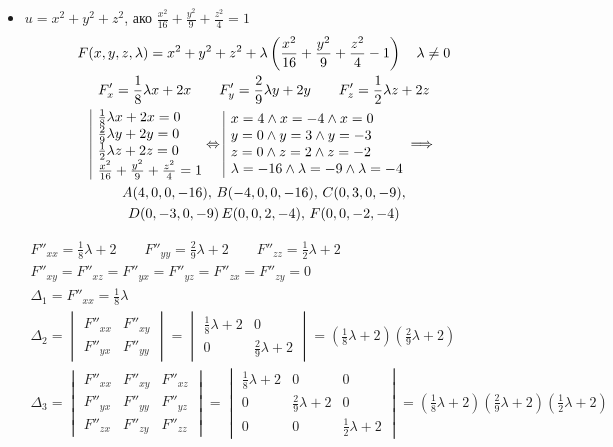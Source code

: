 \documentclass[a4paper,fleqn,12pt]{article}
\theoremstyle{definition}
\begin{document}
\begin{itemize}
\item $u = x^2 + y^2 + z^2$, ако $\frac{x^2}{16} + \frac{y^2}{9} + \frac{z^2}{4} = 1$
\begin{gather*}
F(x,y,z,\lambda) = x^2 + y^2 + z^2 + \lambda\left( \frac{x^2}{16} + \frac{y^2}{9} + \frac{z^2}{4} - 1 \right)   \quad \lambda \neq 0 \\
F'_x = \frac{1}{8}\lambda x + 2x \qquad F'_y = \frac{2}{9}\lambda y+ 2y \qquad F'_z = \frac{1}{2}\lambda z + 2z\\
\begin{array}{|l@{}}
\frac{1}{8}\lambda x + 2x= 0\\
\frac{2}{9}\lambda y+ 2y = 0 \\
\frac{1}{2}\lambda z + 2z = 0\\
\frac{x^2}{16} + \frac{y^2}{9} + \frac{z^2}{4} = 1
\end{array}\Leftrightarrow 
\begin{array}{|l@{}}
x =  4 \land x = -4 \land x = 0\\
y =  0 \land y = 3 \land y = -3\\
z = 0 \land z = 2 \land z = -2 \\
\lambda = -16 \land \lambda = -9 \land \lambda = -4
\end{array} \implies \\ 
A (4,0,0,-16), \, 
B(-4,0,0,-16), \, 
C(0,3,0,-9), \\
D(0,-3,0,-9) \, 
E(0,0,2,-4), \, 
F(0,0,-2,-4) 
\end{gather*}

\begin{gather*}
F''_{xx} = \frac{1}{8} \lambda + 2 \qquad  F''_{yy} = \frac{2}{9} \lambda + 2 \qquad  F''_{zz} = \frac{1}{2} \lambda + 2 \\
F''_{xy} = F''_{xz} = F''_{yx} = F''_{yz} = F''_{zx} = F''_{zy} = 0 \\ 
\Delta_1 = F''_{xx} =  \frac{1}{8} \lambda \\
\Delta_2 = \begin{vmatrix} F''_{xx} & F''_{xy} \\ F''_{yx} & F''_{yy} \end{vmatrix} = \begin{vmatrix} \frac{1}{8} \lambda + 2 & 0 \\  0 & \frac{2}{9} \lambda + 2  \end{vmatrix} = \left( \frac{1}{8} \lambda + 2 \right)\left( \frac{2}{9} \lambda + 2 \right) \\
\Delta_3 = \begin{vmatrix} F''_{xx} & F''_{xy} & F''_{xz}\\ F''_{yx} & F''_{yy} & F''_{yz} \\ F''_{zx} & F''_{zy} & F''_{zz}\end{vmatrix} = \begin{vmatrix} \frac{1}{8} \lambda + 2 & 0 & 0 \\0 & \frac{2}{9} \lambda + 2 & 0 \\ 0 & 0 & \frac{1}{2} \lambda + 2 \end{vmatrix} = \left( \frac{1}{8} \lambda + 2 \right)\left( \frac{2}{9} \lambda + 2 \right) \left( \frac{1}{2} \lambda + 2 \right)
\end{gather*}


\end{itemize}
\end{document}

